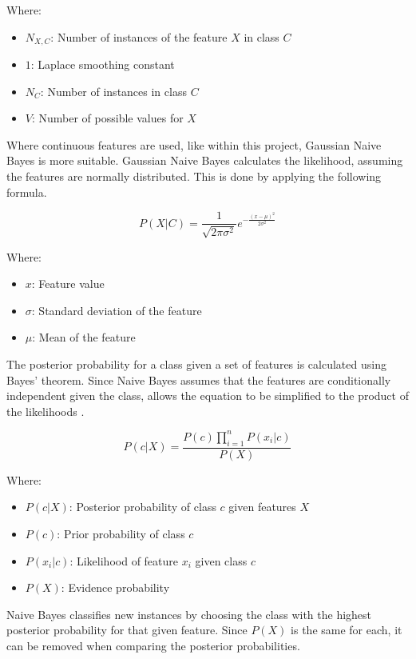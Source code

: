 Where:
\begin{itemize}
    \item $N_{X,C}$: Number of instances of the feature $X$ in class $C$
    \item $1$: Laplace smoothing constant
    \item $N_C$: Number of instances in class $C$
    \item $V$: Number of possible values for $X$
\end{itemize}


Where continuous features are used, like within this project, Gaussian Naive Bayes is more suitable. Gaussian Naive Bayes calculates the likelihood, assuming the features are normally distributed. This is done by applying the following formula.

\begin{equation}
    \label{eq:gaussian}
    P(X | C) = \frac{1}{\sqrt{2\pi\sigma^2}} e^{-\frac{(x - \mu)^2}{2\sigma^2}}
\end{equation}

Where:
\begin{itemize}
    \item $x$: Feature value
    \item $\sigma$: Standard deviation of the feature
    \item $\mu$: Mean of the feature
\end{itemize}

The posterior probability for a class given a set of features is calculated using Bayes' theorem. Since Naive Bayes assumes that the features are conditionally independent given the class, allows the equation to be simplified to the product of the likelihoods \cite{lowdNaiveBayesModels2005}.

\begin{equation}
    \label{eq:posterior}
    P(c | X) = \frac {P(c) \prod_{i=1}^{n} P(x_i | c)} {P(X)}
\end{equation}

Where:
\begin{itemize}
    \item $P(c | X)$: Posterior probability of class $c$ given features $X$
    \item $P(c)$: Prior probability of class $c$
    \item $P(x_i | c)$: Likelihood of feature $x_i$ given class $c$
    \item $P(X)$: Evidence probability
\end{itemize}

Naive Bayes classifies new instances by choosing the class with the highest posterior probability for that given feature. Since $P(X)$ is the same for each, it can be removed when comparing the posterior probabilities.

